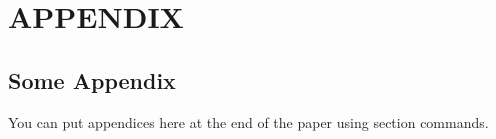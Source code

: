 \documentclass[letterpaper,12pt]{article}
\theoremstyle{definition}
\begin{document}
\section*{APPENDIX}                              %

\begin{spacing}{1.0}

\section{Some Appendix}\label{AppSomeAppendix}

  You can put appendices here at the end of the paper using section commands.




\end{spacing}
\end{document}
